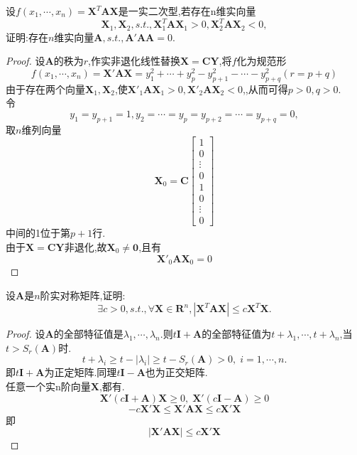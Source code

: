 \documentclass[lang=cn,11pt,normal]{elegantbook}
\renewcommand{\AA}{\boldsymbol{A}}
\newcommand{\CC}{\boldsymbol{C}}
\newcommand{\XX}{\boldsymbol{X}}
\newcommand{\II}{\boldsymbol{I}}
\begin{document}
	\begin{exercise}
		设$f(x_1,\cdots,x_n)=\XX^T\boldsymbol{AX}$是一实二次型,若存在n维实向量
		\begin{equation}
		\XX_1,\XX_2,s.t.,\XX_1^T\boldsymbol{AX}_1>0,\XX_2^T\boldsymbol{AX}_2<0,
		\end{equation}
		证明:存在$n$维实向量$\AA,s.t.,\AA'\AA\AA=0.$
	\end{exercise}
	\begin{proof}
		设$\AA$的秩为$r$,作实非退化线性替换$\XX=\boldsymbol{CY}$,将$f$化为规范形
		\begin{equation}
		f(x_1,\cdots,x_n)=\XX'\boldsymbol{AX}=y_1^2+\cdots+y_p^2-y^2_{p+1}-\cdots-y^2_{p+q}(r=p+q)
		\end{equation}
		由于存在两个向量$\XX_1,\XX_2$,使$\XX'_1\boldsymbol{AX}_1>0,\XX'_2\boldsymbol{AX}_2<0$,,从而可得$p>0,q>0$.\\
		令
		\begin{equation}
		y_1=y_{p+1}=1,y_2=\cdots=y_p=y_{p+2}=\cdots=y_{p+q}=0,
		\end{equation}
		取$n$维列向量
		\begin{equation}
		\XX_0=\CC
		\begin{bmatrix}
		1\\0\\\vdots\\0\\1\\0\\\vdots\\0
		\end{bmatrix}
		\end{equation}
		中间的1位于第$p+1$行.\\
		由于$\XX=\boldsymbol{CY}$非退化,故$\XX_0\ne\boldsymbol{0}$,且有
		\begin{equation}
		\XX'_0\boldsymbol{AX}_0=0
		\end{equation}
	\end{proof}
	\begin{exercise}
		设$\AA$是$n$阶实对称矩阵,证明:
		\begin{equation}
		\exists c>0,s.t., \forall \XX\in \boldsymbol{R}^n,|\XX^T\AA\XX|\leq c\XX^T\XX.
		\end{equation}
	\end{exercise}
	\begin{proof}
		设$\AA$的全部特征值是$\lambda_1,\cdots,\lambda_n$.则$t\II+\AA$的全部特征值为$t+\lambda_1,\cdots,t+\lambda_n$,当$t>S_r(\AA)$时.
		\begin{equation}
		t+\lambda_i\geq t-|\lambda_i|\geq t-S_r(\AA)>0,\;i=1,\cdots,n.
		\end{equation}
		即$t\II+\AA$为正定矩阵.同理$t\II-\AA$也为正交矩阵.\\
		任意一个实n阶向量$\XX$,都有.
		\begin{equation}
		\XX'(c\II+\AA)\XX\geqslant 0,\;\XX'(c\II-\AA)\geqslant 0
		\end{equation}
		\begin{equation}
		-c\XX'\XX\leqslant \XX'\boldsymbol{AX}\leqslant c\XX'\XX
		\end{equation}
		即
		\begin{equation}
		|\XX'\boldsymbol{AX}|\leqslant c\XX'\XX
		\end{equation}
	\end{proof}
\end{document}
